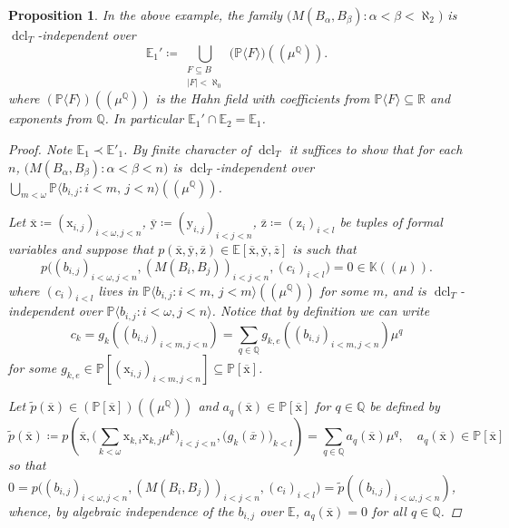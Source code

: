 \documentclass{amsart}
\newtheorem{proposition}[theorem]{Proposition}
\theoremstyle{remark}
\theoremstyle{definition}
\theoremstyle{plain}
\newcommand{\bE}{\mathbb E}
\newcommand{\bK}{\mathbb K}
\newcommand{\bP}{\mathbb P}
\newcommand{\bQ}{\mathbb Q}
\newcommand{\bR}{\mathbb R}
\DeclareMathOperator{\dcl}{\mathrm{dcl}}
\newcommand{\Lhp}{(\!(}
\newcommand{\Rhp}{)\!)}
\newcommand{\var}[1]{\mathrm{#1}}
\theoremstyle{plain}
\begin{document}
\begin{proposition}\label{prop:Example_indpendence+}
   In the above example, the family $\big(M(B_\alpha, B_\beta): \alpha<\beta<\aleph_2\big)$ is $\dcl_T$-independent over 
   \[\bE_1'\coloneqq \bigcup_{\substack{F \subseteq B\\|F|<\aleph_0}} \big(\bP \langle F\rangle \big) \Lhp \mu^\bQ \Rhp.\]
   where $ (\bP\langle F\rangle)\Lhp \mu^\bQ\Rhp$ is the Hahn field with coefficients from $\bP\langle F \rangle \subseteq \bR$ and exponents from $\bQ$. In particular $\bE_1' \cap \bE_2=\bE_1$.
\begin{proof}
    Note $\bE_1 \prec \bE'_1$. By finite character of $\dcl_T$ it suffices to show that for each $n$, $\big(M(B_\alpha, B_\beta): \alpha < \beta<n\big)$ is $\dcl_T$-independent over $\bigcup_{m<\omega} \bP \langle b_{i,j}: i<m,\, j<n\rangle \Lhp \mu^\bQ \Rhp$.

    Let $\overline{\var{x}}\coloneqq (\var{x}_{i,j})_{i<\omega, j<n}$, $\overline{\var{y}}\coloneqq (\var{y}_{i,j})_{i<j<n}$, $\overline{\var{z}}\coloneqq (\var{z}_{i})_{i<l}$ be tuples of formal variables and suppose that $p(\overline{\var{x}}, \overline{\var{y}}, \overline{\var{z}}) \in \bE [\overline{\var{x}}, \overline{\var{y}}, \overline{z}]$
    is such that 
    \[p\big( (b_{i,j})_{i<\omega, j<n}, (M(B_i, B_j))_{i<j<n}, (c_{i})_{i<l}\big)=0\in \bK\Lhp \mu \Rhp.\]
    where $(c_i)_{i<l}$ lives in $\bP \langle b_{i,j}: i<m,\, j<m\rangle \Lhp \mu^\bQ \Rhp$ for some $m$, and is $\dcl_T$-independent over $\bP\langle b_{i,j} : i<\omega, j<n\rangle$. Notice that by definition we can write
    \[c_k = g_k((b_{i,j})_{i<m, j<n})= \sum_{q \in \bQ} g_{k,e} ((b_{i,j})_{i<m, j<n}) \mu^q\]
    for some $g_{k,e}\in \bP[(\var{x}_{i,j})_{i<m, j<n}]\subseteq \bP[\overline{\var{x}}]$.
    
    Let $\tilde{p}(\overline{\var{x}}) \in (\bP [\overline{\var{x}}])\Lhp \mu^\bQ\Rhp$ and $a_q(\overline{\var{x}}) \in \bP[\overline{\var{x}}]$ for $q \in \bQ$ be defined by
    \[\tilde{p}( \overline{\var{x}})\coloneqq 
    p\left(\overline{\var{x}},
        \big(\sum_{k<\omega} \var{x}_{k,i}\var{x}_{k,j} \mu^k\big)_{i<j<n},
        \big(g_k(\overline{x})\big)_{k<l}\right) =
    \sum_{q \in \bQ} a_q(\overline{\var{x}}) \mu^q, \quad a_q(\overline{\var{x}}) \in \bP[\overline{\var{x}}]\]
    so that $0=p\big( (b_{i,j})_{i<\omega, j<n}, (M(B_i, B_j))_{i<j<n}, (c_i)_{i<l}\big)=\tilde{p}( (b_{i,j})_{i<\omega, j<n})$, whence, by algebraic independence of the $b_{i,j}$ over $\bE$, $a_q(\overline{\var{x}})=0$ for all $q \in \bQ$.


\end{proof}
\end{proposition}
\end{document}
